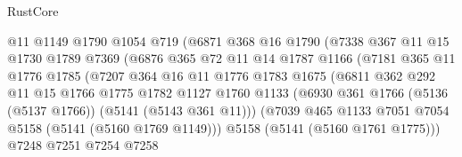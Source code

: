 \begin{lexlean}{RustCore}
\begin{coremodule}
                          @11
                          @1149
                          @1790
                          @1054
                          @719
                          (@6871
                            @368
                            @16
                            @1790
                            (@7338
                              @367
                              @11
                              @15
                              @1730
                              @1789
                              @7369
                              (@6876
                                @365
                                @72
                                @11
                                @14
                                @1787
                                @1166
                                (@7181
                                  @365
                                  @11
                                  @1776
                                  @1785
                                  (@7207
                                    @364
                                    @16
                                    @11
                                    @1776
                                    @1783
                                    @1675
                                    (@6811
                                      @362
                                      @292
                                      @11
                                      @15
                                      @1766
                                      @1775
                                      @1782
                                      @1127
                                      @1760
                                      @1133
                                      (@6930
                                        @361
                                        @1766
                                        (@5136 (@5137 @1766))
                                        (@5141 (@5143 @361 @11)))
                                      (@7039
                                        @465
                                        @1133
                                        @7051
                                        @7054
                                        @5158
                                        (@5141 (@5160 @1769 @1149)))
                                      @5158
                                      (@5141 (@5160 @1761 @1775)))
                                    @7248
                                    @7251
                                    @7254
                                    @7258

\end{coremodule}
\end{lexlean}
